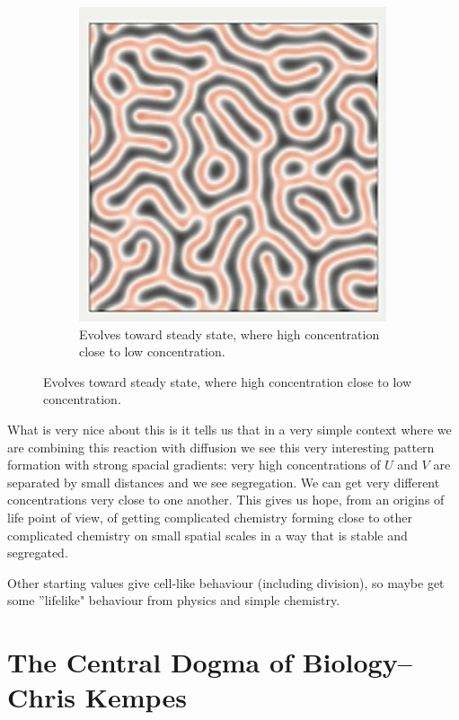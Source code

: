 \documentclass[]{article}
\begin{document}
\begin{figure}[H]
\begin{subfigure}[b]{0.3\textwidth}
	\end{subfigure}
	\begin{subfigure}[b]{0.3\textwidth}
		\centering
		\caption{Evolves toward steady state,  where high concentration close to low concentration.}
		\includegraphics[width=\textwidth]{GreyScottFinal}
	\end{subfigure}
\end{figure}

What is very nice about this is it tells us that in a very simple context where we are combining this reaction with diffusion we see this very interesting pattern formation with strong spacial gradients: very high concentrations of $U$ and $V$ are separated by small distances and we see segregation. We can get very different concentrations very close to one another. This gives us hope, from an origins of life point of view, of getting complicated chemistry forming close to other complicated chemistry on small spatial scales in a way that is stable and segregated. 

Other starting values give cell-like behaviour (including division), so maybe get some ''lifelike" behaviour from physics and simple chemistry.

\section[The Central Dogma of Biology]{The Central Dogma of Biology--Chris Kempes}
\end{document}
